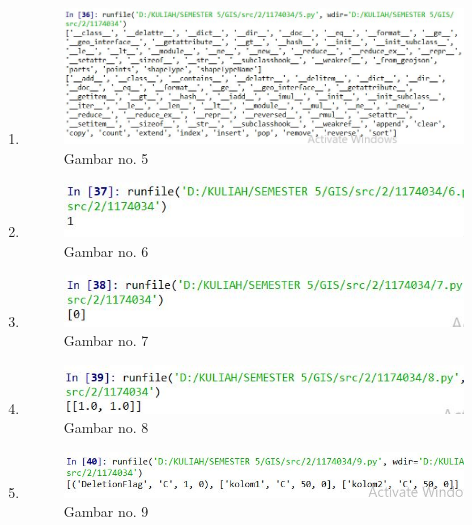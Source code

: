 \begin{enumerate}
	\item 
	
	\begin{figure}[H]
		\includegraphics[width=12cm]{figures/1174034/tugas3/5.PNG}
		\centering
		\caption{Gambar no. 5}
	\end{figure}
	
	\item 
	
	\begin{figure}[H]
		\includegraphics[width=12cm]{figures/1174034/tugas3/6.PNG}
		\centering
		\caption{Gambar no. 6}
	\end{figure}
	
	\item 
	
	\begin{figure}[H]
		\includegraphics[width=12cm]{figures/1174034/tugas3/7.PNG}
		\centering
		\caption{Gambar no. 7}
	\end{figure}
	
	\item 
	
	\begin{figure}[H]
		\includegraphics[width=12cm]{figures/1174034/tugas3/8.PNG}
		\centering
		\caption{Gambar no. 8}
	\end{figure}
	
	\item 
	
	\begin{figure}[H]
		\includegraphics[width=12cm]{figures/1174034/tugas3/9.PNG}
		\centering
		\caption{Gambar no. 9}
	\end{figure}


\end{enumerate}
